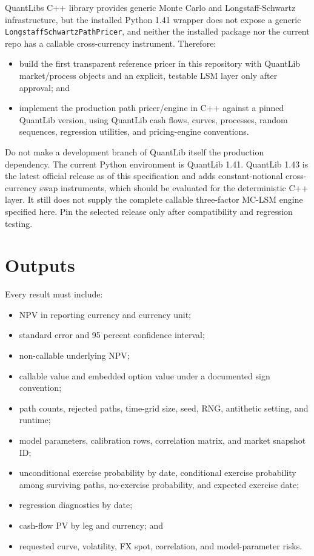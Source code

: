 \documentclass[conference]{IEEEtran}
\newcommand{\passthrough}[1]{#1}
\providecommand{\tightlist}{}
\begin{document}
QuantLib\textquotesingle s C++ library provides generic Monte Carlo and
Longstaff-Schwartz infrastructure, but the installed Python 1.41 wrapper
does not expose a generic
\passthrough{\lstinline!LongstaffSchwartzPathPricer!}, and neither the
installed package nor the current repo has a callable cross-currency
instrument. Therefore:

\begin{itemize}
\tightlist
\item
  build the first transparent reference pricer in this repository with
  QuantLib market/process objects and an explicit, testable LSM layer
  only after approval; and
\item
  implement the production path pricer/engine in C++ against a pinned
  QuantLib version, using QuantLib cash flows, curves, processes, random
  sequences, regression utilities, and pricing-engine conventions.
\end{itemize}

Do not make a development branch of QuantLib itself the production
dependency. The current Python environment is QuantLib 1.41. QuantLib
1.43 is the latest official release as of this specification and adds
constant-notional cross-currency swap instruments, which should be
evaluated for the deterministic C++ layer. It still does not supply the
complete callable three-factor MC-LSM engine specified here. Pin the
selected release only after compatibility and regression testing.

\section{Outputs}\label{10-outputs}

Every result must include:

\begin{itemize}
\tightlist
\item
  NPV in reporting currency and currency unit;
\item
  standard error and 95 percent confidence interval;
\item
  non-callable underlying NPV;
\item
  callable value and embedded option value under a documented sign
  convention;
\item
  path counts, rejected paths, time-grid size, seed, RNG, antithetic
  setting, and runtime;
\item
  model parameters, calibration rows, correlation matrix, and market
  snapshot ID;
\item
  unconditional exercise probability by date, conditional exercise
  probability among surviving paths, no-exercise probability, and
  expected exercise date;
\item
  regression diagnostics by date;
\item
  cash-flow PV by leg and currency; and
\item
  requested curve, volatility, FX spot, correlation, and model-parameter
  risks.
\end{itemize}
\end{document}
